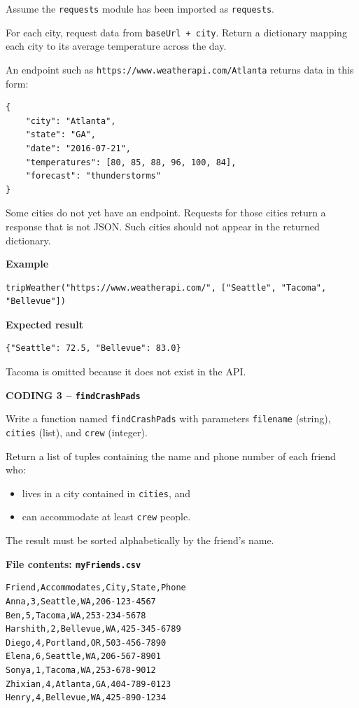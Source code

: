 \documentclass[11pt,addpoints]{exam}
\begin{document}
\begin{questions}
Assume the \texttt{requests} module has been imported as \texttt{requests}.

For each city, request data from \texttt{baseUrl + city}. Return a dictionary mapping each city to its average temperature across the day.

An endpoint such as \texttt{https://www.weatherapi.com/Atlanta} returns data in this form:
\begin{lstlisting}
{
    "city": "Atlanta",
    "state": "GA",
    "date": "2016-07-21",
    "temperatures": [80, 85, 88, 96, 100, 84],
    "forecast": "thunderstorms"
}
\end{lstlisting}

Some cities do not yet have an endpoint. Requests for those cities return a response that is not JSON. Such cities should not appear in the returned dictionary.

\textbf{Example}
\begin{lstlisting}
tripWeather("https://www.weatherapi.com/", ["Seattle", "Tacoma", "Bellevue"])
\end{lstlisting}

\textbf{Expected result}
\begin{lstlisting}
{"Seattle": 72.5, "Bellevue": 83.0}
\end{lstlisting}
Tacoma is omitted because it does not exist in the API.
\vfill
\noindent\fbox{\parbox[t][4in][t]{\dimexpr\linewidth-2\fboxsep-2\fboxrule\relax}{\strut}}
\vfill


\newpage
\question[14] \textbf{CODING 3 -- \texttt{findCrashPads}}

Write a function named \texttt{findCrashPads} with parameters \texttt{filename} (string), \texttt{cities} (list), and \texttt{crew} (integer).

Return a list of tuples containing the name and phone number of each friend who:
\begin{itemize}[leftmargin=1.4em,itemsep=0.2em]
  \item lives in a city contained in \texttt{cities}, and
  \item can accommodate at least \texttt{crew} people.
\end{itemize}

The result must be sorted alphabetically by the friend's name.

\textbf{File contents: \texttt{myFriends.csv}}
\begin{lstlisting}
Friend,Accommodates,City,State,Phone
Anna,3,Seattle,WA,206-123-4567
Ben,5,Tacoma,WA,253-234-5678
Harshith,2,Bellevue,WA,425-345-6789
Diego,4,Portland,OR,503-456-7890
Elena,6,Seattle,WA,206-567-8901
Sonya,1,Tacoma,WA,253-678-9012
Zhixian,4,Atlanta,GA,404-789-0123
Henry,4,Bellevue,WA,425-890-1234
\end{lstlisting}


\end{questions}
\end{document}
